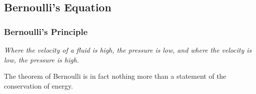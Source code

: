 \documentclass[]{beamer}
\begin{document}
\subsection{Bernoulli's Equation}

\begin{frame}
\frametitle{Bernoulli's Principle}

\textit{Where the velocity of a fluid is high, the pressure is low, 
and where the velocity is low, the pressure is high.}
\pause

\vspace{5mm}

\textcolor{mypink1}{The theorem of Bernoulli is in fact nothing more than a statement of the
conservation of energy.}

  \end{frame}






\end{document}
